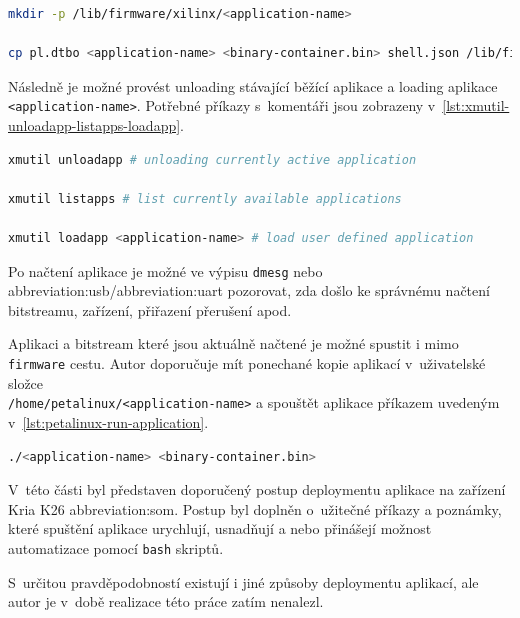 \documentclass[a4paper, twoside, 11pt]{article}
\begin{document}
	\begin{lstlisting}[language={sh}, caption={Příkaz vytvoření potřebné složky aplikace a kopírování potřebných souborů firmwaru.}, label={lst:cp-application-to-firmware}, morekeywords={mkdir, cp}]
mkdir -p /lib/firmware/xilinx/<application-name>

cp pl.dtbo <application-name> <binary-container.bin> shell.json /lib/firmware/xilinx/<application-name>\end{lstlisting}
	
	Následně je možné provést unloading stávající běžící aplikace a loading aplikace \texttt{<application-name>}. Potřebné příkazy s~komentáři jsou zobrazeny v~\ref{lst:xmutil-unloadapp-listapps-loadapp}.\par

	\begin{lstlisting}[language={sh}, caption={Příkaz vytvoření potřebné složky aplikace a kopírování potřebných souborů firmwaru.}, label={lst:xmutil-unloadapp-listapps-loadapp}, morekeywords={xmutil}]
xmutil unloadapp # unloading currently active application

xmutil listapps # list currently available applications

xmutil loadapp <application-name> # load user defined application
\end{lstlisting}

Po načtení aplikace je možné ve výpisu \texttt{dmesg} nebo \gls{abbreviation:usb}/\gls{abbreviation:uart} pozorovat, zda došlo ke správnému načtení bitstreamu, zařízení, přiřazení přerušení apod.\par
Aplikaci a bitstream které jsou aktuálně načtené je možné spustit i mimo \texttt{firmware} cestu. Autor doporučuje mít ponechané kopie aplikací v~uživatelské složce\\\texttt{/home/petalinux/<application-name>} a spouštět aplikace příkazem uvedeným v~\ref{lst:petalinux-run-application}.\par


	\begin{lstlisting}[language={sh}, caption={Příkaz pro spuštění akcelerované aplikace.}, label={lst:petalinux-run-application}]
./<application-name> <binary-container.bin>\end{lstlisting}

	V~této části byl představen doporučený postup deploymentu aplikace na zařízení Kria K26 \gls{abbreviation:som}. Postup byl doplněn o~užitečné příkazy a poznámky, které spuštění aplikace urychlují, usnadňují a nebo přinášejí možnost automatizace pomocí \texttt{bash} skriptů.\par
	S~určitou pravděpodobností existují i jiné způsoby deploymentu aplikací, ale autor je v~době realizace této práce zatím nenalezl.
\end{document}
